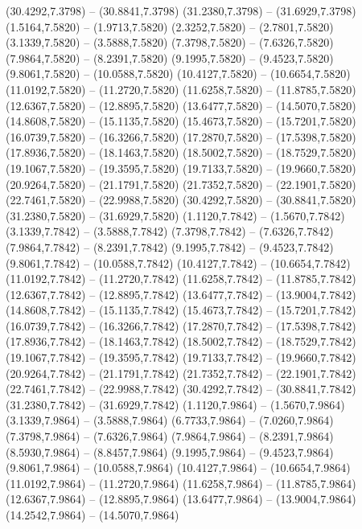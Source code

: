 {\begin{scope}[shift={(#1,#2)}]
    (30.4292,7.3798) -- (30.8841,7.3798)
    (31.2380,7.3798) -- (31.6929,7.3798)
    (1.5164,7.5820) -- (1.9713,7.5820)
    (2.3252,7.5820) -- (2.7801,7.5820)
    (3.1339,7.5820) -- (3.5888,7.5820)
    (7.3798,7.5820) -- (7.6326,7.5820)
    (7.9864,7.5820) -- (8.2391,7.5820)
    (9.1995,7.5820) -- (9.4523,7.5820)
    (9.8061,7.5820) -- (10.0588,7.5820)
    (10.4127,7.5820) -- (10.6654,7.5820)
    (11.0192,7.5820) -- (11.2720,7.5820)
    (11.6258,7.5820) -- (11.8785,7.5820)
    (12.6367,7.5820) -- (12.8895,7.5820)
    (13.6477,7.5820) -- (14.5070,7.5820)
    (14.8608,7.5820) -- (15.1135,7.5820)
    (15.4673,7.5820) -- (15.7201,7.5820)
    (16.0739,7.5820) -- (16.3266,7.5820)
    (17.2870,7.5820) -- (17.5398,7.5820)
    (17.8936,7.5820) -- (18.1463,7.5820)
    (18.5002,7.5820) -- (18.7529,7.5820)
    (19.1067,7.5820) -- (19.3595,7.5820)
    (19.7133,7.5820) -- (19.9660,7.5820)
    (20.9264,7.5820) -- (21.1791,7.5820)
    (21.7352,7.5820) -- (22.1901,7.5820)
    (22.7461,7.5820) -- (22.9988,7.5820)
    (30.4292,7.5820) -- (30.8841,7.5820)
    (31.2380,7.5820) -- (31.6929,7.5820)
    (1.1120,7.7842) -- (1.5670,7.7842)
    (3.1339,7.7842) -- (3.5888,7.7842)
    (7.3798,7.7842) -- (7.6326,7.7842)
    (7.9864,7.7842) -- (8.2391,7.7842)
    (9.1995,7.7842) -- (9.4523,7.7842)
    (9.8061,7.7842) -- (10.0588,7.7842)
    (10.4127,7.7842) -- (10.6654,7.7842)
    (11.0192,7.7842) -- (11.2720,7.7842)
    (11.6258,7.7842) -- (11.8785,7.7842)
    (12.6367,7.7842) -- (12.8895,7.7842)
    (13.6477,7.7842) -- (13.9004,7.7842)
    (14.8608,7.7842) -- (15.1135,7.7842)
    (15.4673,7.7842) -- (15.7201,7.7842)
    (16.0739,7.7842) -- (16.3266,7.7842)
    (17.2870,7.7842) -- (17.5398,7.7842)
    (17.8936,7.7842) -- (18.1463,7.7842)
    (18.5002,7.7842) -- (18.7529,7.7842)
    (19.1067,7.7842) -- (19.3595,7.7842)
    (19.7133,7.7842) -- (19.9660,7.7842)
    (20.9264,7.7842) -- (21.1791,7.7842)
    (21.7352,7.7842) -- (22.1901,7.7842)
    (22.7461,7.7842) -- (22.9988,7.7842)
    (30.4292,7.7842) -- (30.8841,7.7842)
    (31.2380,7.7842) -- (31.6929,7.7842)
    (1.1120,7.9864) -- (1.5670,7.9864)
    (3.1339,7.9864) -- (3.5888,7.9864)
    (6.7733,7.9864) -- (7.0260,7.9864)
    (7.3798,7.9864) -- (7.6326,7.9864)
    (7.9864,7.9864) -- (8.2391,7.9864)
    (8.5930,7.9864) -- (8.8457,7.9864)
    (9.1995,7.9864) -- (9.4523,7.9864)
    (9.8061,7.9864) -- (10.0588,7.9864)
    (10.4127,7.9864) -- (10.6654,7.9864)
    (11.0192,7.9864) -- (11.2720,7.9864)
    (11.6258,7.9864) -- (11.8785,7.9864)
    (12.6367,7.9864) -- (12.8895,7.9864)
    (13.6477,7.9864) -- (13.9004,7.9864)
    (14.2542,7.9864) -- (14.5070,7.9864)

\end{scope}}
